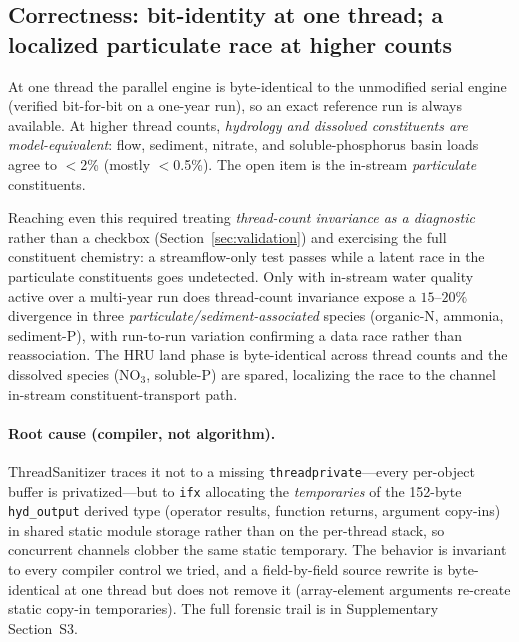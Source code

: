 \subsection{Correctness: bit-identity at one thread; a localized particulate race at higher counts}\label{sec:correctness}
At one thread the parallel engine is byte-identical to the unmodified serial engine
(verified bit-for-bit on a one-year run), so an exact reference run is always available. At higher
thread counts, \emph{hydrology and
dissolved constituents are model-equivalent}: flow, sediment, nitrate, and soluble-phosphorus
basin loads agree to $<$2\% (mostly $<$0.5\%). The open item is the in-stream \emph{particulate}
constituents.

Reaching even this required treating \emph{thread-count invariance as a diagnostic} rather than a
checkbox (Section~\ref{sec:validation}) and exercising the full constituent chemistry: a
streamflow-only test passes while a latent race in the particulate constituents goes undetected.
Only with in-stream water quality active over a multi-year run does thread-count invariance expose a
$15$--$20\%$ divergence in three \emph{particulate/sediment-associated} species (organic-N, ammonia,
sediment-P), with run-to-run variation confirming a data race rather than reassociation. The HRU
land phase is byte-identical across thread counts and the dissolved species (NO$_3$, soluble-P) are
spared, localizing the race to the channel in-stream constituent-transport path.

\paragraph{Root cause (compiler, not algorithm).} ThreadSanitizer traces it not to a missing
\texttt{threadprivate}---every per-object buffer is privatized---but to \texttt{ifx} allocating the
\emph{temporaries} of the 152-byte \texttt{hyd\_output} derived type (operator results, function
returns, argument copy-ins) in shared static module storage rather than on the per-thread
stack, so concurrent channels clobber the same static temporary. The behavior is invariant to every
compiler control we tried, and a field-by-field source rewrite is byte-identical at one thread but
does not remove it (array-element arguments re-create static copy-in temporaries). The full forensic
trail is in Supplementary Section~S3.

